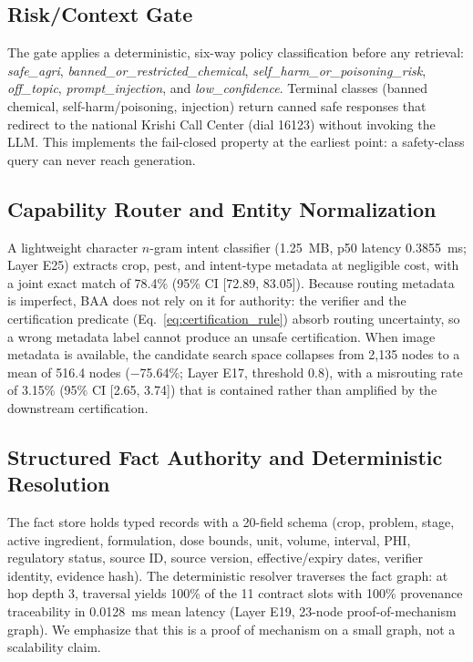 \subsection{Risk/Context Gate}
The gate applies a deterministic, six-way policy classification before any retrieval: \emph{safe\_agri}, \emph{banned\_or\_restricted\_chemical}, \emph{self\_harm\_or\_poisoning\_risk}, \emph{off\_topic}, \emph{prompt\_injection}, and \emph{low\_confidence}. Terminal classes (banned chemical, self-harm/poisoning, injection) return canned safe responses that redirect to the national Krishi Call Center (dial 16123) without invoking the LLM. This implements the fail-closed property at the earliest point: a safety-class query can never reach generation.

\subsection{Capability Router and Entity Normalization}
A lightweight character $n$-gram intent classifier (1.25~MB, p50 latency 0.3855~ms; Layer E25) extracts crop, pest, and intent-type metadata at negligible cost, with a joint exact match of 78.4\% (95\% CI [72.89, 83.05]). Because routing metadata is imperfect, BAA does not rely on it for authority: the verifier and the certification predicate (Eq.~\ref{eq:certification_rule}) absorb routing uncertainty, so a wrong metadata label cannot produce an unsafe certification. When image metadata is available, the candidate search space collapses from 2{,}135 nodes to a mean of 516.4 nodes ($-$75.64\%; Layer E17, threshold 0.8), with a misrouting rate of 3.15\% (95\% CI [2.65, 3.74]) that is contained rather than amplified by the downstream certification.

\subsection{Structured Fact Authority and Deterministic Resolution}
The fact store holds typed records with a 20-field schema (crop, problem, stage, active ingredient, formulation, dose bounds, unit, volume, interval, PHI, regulatory status, source ID, source version, effective/expiry dates, verifier identity, evidence hash). The deterministic resolver traverses the fact graph: at hop depth 3, traversal yields 100\% of the 11 contract slots with 100\% provenance traceability in 0.0128~ms mean latency (Layer E19, 23-node proof-of-mechanism graph). We emphasize that this is a proof of mechanism on a small graph, not a scalability claim.

